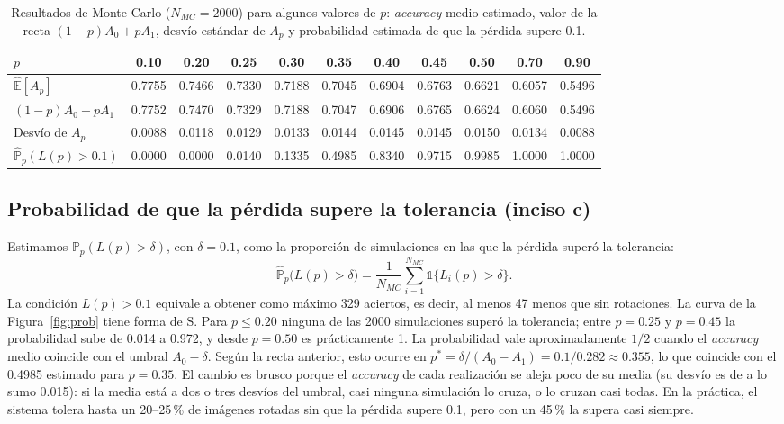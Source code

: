 \documentclass[11pt,a4paper]{article}
\newcommand{\E}{\mathbb{E}}
\newcommand{\Prob}{\mathbb{P}}
\newcommand{\ind}{\mathds{1}}
\newcommand{\acc}{\emph{accuracy}}
\begin{document}
\begin{table}[H]
  \centering
  \caption{Resultados de Monte Carlo ($N_{MC}=2000$) para algunos valores de $p$: \emph{accuracy} medio
           estimado, valor de la recta $(1-p)A_0+pA_1$, desvío estándar de $A_p$ y probabilidad estimada de
           que la pérdida supere 0.1.}
  \label{tab:mc}
  \small
  \setlength{\tabcolsep}{4.5pt}
  \begin{tabular}{lcccccccccc}
    \toprule
    $p$ & 0.10 & 0.20 & 0.25 & 0.30 & 0.35 & 0.40 & 0.45 & 0.50 & 0.70 & 0.90 \\
    \midrule
    $\widehat{\E}[A_p]$           & 0.7755 & 0.7466 & 0.7330 & 0.7188 & 0.7045 & 0.6904 & 0.6763 & 0.6621 & 0.6057 & 0.5496 \\
    $(1-p)A_0+pA_1$               & 0.7752 & 0.7470 & 0.7329 & 0.7188 & 0.7047 & 0.6906 & 0.6765 & 0.6624 & 0.6060 & 0.5496 \\
    Desvío de $A_p$               & 0.0088 & 0.0118 & 0.0129 & 0.0133 & 0.0144 & 0.0145 & 0.0145 & 0.0150 & 0.0134 & 0.0088 \\
    $\widehat{\Prob}_p(L(p)>0.1)$ & 0.0000 & 0.0000 & 0.0140 & 0.1335 & 0.4985 & 0.8340 & 0.9715 & 0.9985 & 1.0000 & 1.0000 \\
    \bottomrule
  \end{tabular}
\end{table}

\subsection{Probabilidad de que la pérdida supere la tolerancia (inciso c)}

Estimamos $\Prob_p(L(p)>\delta)$, con $\delta=0.1$, como la proporción de simulaciones en las que la pérdida
superó la tolerancia:
\[ \widehat{\Prob}_p\big(L(p)>\delta\big) = \frac{1}{N_{MC}}\sum_{i=1}^{N_{MC}}\ind\{L_i(p)>\delta\} . \]
La condición $L(p)>0.1$ equivale a obtener como máximo 329 aciertos, es decir, al menos 47 menos que sin
rotaciones. La curva de la Figura~\ref{fig:prob} tiene forma de S. Para $p\le0.20$ ninguna de las 2000
simulaciones superó la tolerancia; entre $p=0.25$ y $p=0.45$ la probabilidad sube de 0.014 a 0.972, y desde
$p=0.50$ es prácticamente 1. La probabilidad vale aproximadamente $1/2$ cuando el \acc{} medio coincide con el
umbral $A_0-\delta$. Según la recta anterior, esto ocurre en $p^*=\delta/(A_0-A_1)=0.1/0.282\approx0.355$, lo
que coincide con el 0.4985 estimado para $p=0.35$. El cambio es brusco porque el \acc{} de cada realización
se aleja poco de su media (su desvío es de a lo sumo 0.015): si la media está a dos o tres desvíos del
umbral, casi ninguna simulación lo cruza, o lo cruzan casi todas. En la práctica, el sistema tolera hasta un
20--25\,\% de imágenes rotadas sin que la pérdida supere 0.1, pero con un 45\,\% la supera casi siempre.
\end{document}
